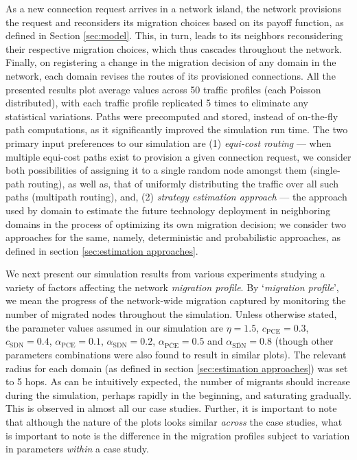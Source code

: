 \documentclass[smallextended]{svjour3}
\begin{document}
\par As a new connection request arrives in a network island, the network
provisions the request and reconsiders its migration choices based on its payoff
function, as defined in Section \ref{sec:model}. This, in turn, leads to its
neighbors reconsidering their respective migration choices, which thus cascades
throughout the network. Finally, on registering a change in the migration
decision of any domain in the network, each domain revises the routes of its
provisioned connections. All the presented results plot average values across 50
traffic profiles (each Poisson distributed), with each traffic profile
replicated 5 times to eliminate any statistical variations.
Paths were precomputed and stored, instead of on-the-fly path computations, as
it significantly improved the simulation run time. The two primary input
preferences to our simulation are (1) \emph{equi-cost routing} ---
when multiple equi-cost paths exist to provision a given connection request, we
consider both possibilities of assigning it to a single random node amongst
them (single-path routing), as well as, that of uniformly distributing the
traffic over all such paths (multipath routing), and, (2) \emph{strategy
estimation approach} --- the approach used by domain to estimate the future
technology deployment in neighboring domains in the process of optimizing its own migration decision; we consider
two approaches for the same, namely, deterministic and probabilistic
approaches, as defined in section \ref{sec:estimation approaches}.

\par We next present our simulation results from various experiments
studying a variety of factors affecting the network \emph{migration profile}.
By `\emph{migration profile}', we mean the progress of the network-wide
migration captured by monitoring the number of migrated nodes throughout the
simulation.
Unless otherwise stated, the parameter values assumed in our simulation are $\eta=1.5$, $c_\textrm{PCE}=0.3$,
$c_\textrm{SDN}=0.4$, $\alpha_\textrm{PCE}=0.1$, $\alpha_\textrm{SDN}=0.2$,
$\alpha_{\overline{\textrm{PCE}}}=0.5$ and
$\alpha_{\overline{\textrm{SDN}}}=0.8$ (though other parameters combinations
were also found to result in similar plots).
The relevant radius for each domain (as defined in section \ref{sec:estimation
approaches}) was set to 5 hops. As can be intuitively expected, the
number of migrants should increase during the simulation, perhaps rapidly in the
beginning, and saturating gradually. This is observed in almost all our case
studies. Further, it is important to note that although the nature of the plots
looks similar \emph{across} the case studies, what is important to note is the
difference in the migration profiles subject to variation in parameters \emph{within}
a case study.
\end{document}
